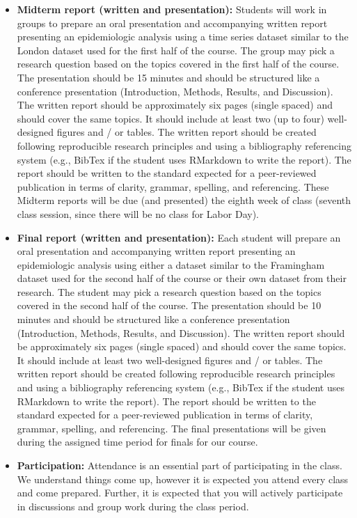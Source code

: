 \documentclass[
]{book}
\providecommand{\tightlist}{%
  \setlength{\itemsep}{0pt}\setlength{\parskip}{0pt}}
\begin{document}
\begin{itemize}
\tightlist
\item
  \textbf{Midterm report (written and presentation):} Students will work in groups to prepare an oral presentation and accompanying written report presenting an epidemiologic
  analysis using a time series dataset similar to the London dataset used
  for the first half of the course. The group may pick a research question
  based on the topics covered in the first half of the course. The presentation
  should be 15 minutes and should be structured like a conference presentation
  (Introduction, Methods, Results, and Discussion). The written report
  should be approximately six pages (single spaced) and should cover the
  same topics. It should include at least two (up to four) well-designed figures and / or
  tables. The written report should be created following reproducible
  research principles and using a bibliography referencing system (e.g.,
  BibTex if the student uses RMarkdown to write the report). The report
  should be written to the standard expected for a peer-reviewed
  publication in terms of clarity, grammar, spelling, and referencing.
  These Midterm reports will be due (and presented) the eighth week of class
  (seventh class session, since there will be no class for Labor Day).
\item
  \textbf{Final report (written and presentation):} Each student will prepare an oral presentation and accompanying written report presenting an epidemiologic
  analysis using either a dataset similar to the Framingham dataset used
  for the second half of the course or their own dataset from their research. The student may pick a research question
  based on the topics covered in the second half of the course. The presentation
  should be 10 minutes and should be structured like a conference presentation
  (Introduction, Methods, Results, and Discussion). The written report
  should be approximately six pages (single spaced) and should cover the
  same topics. It should include at least two well-designed figures and / or
  tables. The written report should be created following reproducible
  research principles and using a bibliography referencing system (e.g.,
  BibTex if the student uses RMarkdown to write the report). The report
  should be written to the standard expected for a peer-reviewed
  publication in terms of clarity, grammar, spelling, and referencing.
  The final presentations will be given during the assigned time period
  for finals for our course.
\item
  \textbf{Participation:} Attendance is an essential part of participating
  in the class. We understand things come up, however it is expected you
  attend every class and come prepared. Further, it is expected that you will
  actively participate in discussions and group work during the class period.
\end{itemize}
\end{document}

